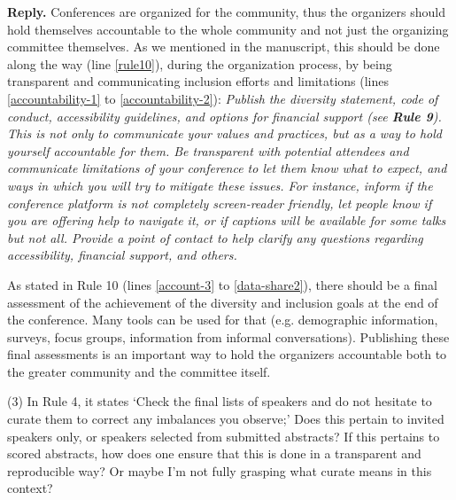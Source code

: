\documentclass{article}
\newenvironment{Reply}{\noindent\color{BlueViolet}\textbf{Reply.}}{\vspace{1em}}
\begin{document}
\begin{Reply}
Conferences are organized for the community, thus the organizers should hold themselves accountable to the whole community and not just the organizing committee themselves.
As we mentioned in the manuscript, this should be done along the way (line \ref{rule10}), during the organization process, by being transparent and communicating inclusion efforts and limitations (lines \ref{accountability-1} to \ref{accountability-2}):
\textit{Publish the diversity statement, code of conduct, accessibility guidelines, and options for financial support (see \textbf{Rule 9}).
This is not only to communicate your values and practices, but as a way to hold yourself accountable for them.
Be transparent with potential attendees and communicate limitations of your conference to let them know what to expect, and ways in which you will try to mitigate these issues. 
For instance, inform if the conference platform is not completely screen-reader friendly, let people know if you are offering help to navigate it, or if captions will be available for some talks but not all.
Provide a point of contact to help clarify any questions regarding accessibility, financial support, and others.}

As stated in Rule 10 (lines \ref{account-3} to \ref{data-share2}), there should be a final assessment of the achievement of the diversity and inclusion goals at the end of the conference. Many tools can be used for that (e.g. demographic information, surveys, focus groups, information from informal conversations). 
Publishing these final assessments is an important way to hold the organizers accountable both to the greater community and the committee itself.
\end{Reply}

(3) In Rule 4, it states `Check the final lists of speakers and do not hesitate to curate them to correct any imbalances you observe;' Does this pertain to invited speakers only, or speakers selected from submitted abstracts? If this pertains to scored abstracts, how does one ensure that this is done in a transparent and reproducible way? Or maybe I'm not fully grasping what curate means in this context?
\end{document}
